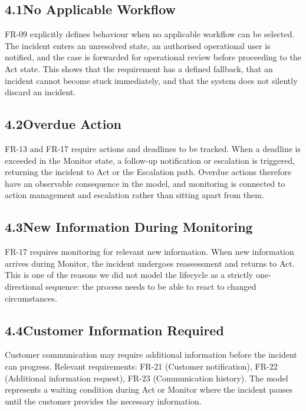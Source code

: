 \documentclass[11pt,a4paper]{article}
\begin{document}
\subsection*{4.1\enspace No Applicable Workflow}

FR-09 explicitly defines behaviour when no applicable workflow can be selected. The incident enters an unresolved state, an authorised operational user is notified, and the case is forwarded for operational review before proceeding to the Act state. This shows that the requirement has a defined fallback, that an incident cannot become stuck immediately, and that the system does not silently discard an incident.

\subsection*{4.2\enspace Overdue Action}

FR-13 and FR-17 require actions and deadlines to be tracked. When a deadline is exceeded in the Monitor state, a follow-up notification or escalation is triggered, returning the incident to Act or the Escalation path. Overdue actions therefore have an observable consequence in the model, and monitoring is connected to action management and escalation rather than sitting apart from them.

\subsection*{4.3\enspace New Information During Monitoring}

FR-17 requires monitoring for relevant new information. When new information arrives during Monitor, the incident undergoes reassessment and returns to Act. This is one of the reasons we did not model the lifecycle as a strictly one-directional sequence: the process needs to be able to react to changed circumstances.

\subsection*{4.4\enspace Customer Information Required}

Customer communication may require additional information before the incident can progress. Relevant requirements: FR-21 (Customer notification), FR-22 (Additional information request), FR-23 (Communication history). The model represents a waiting condition during Act or Monitor where the incident pauses until the customer provides the necessary information.
\end{document}
